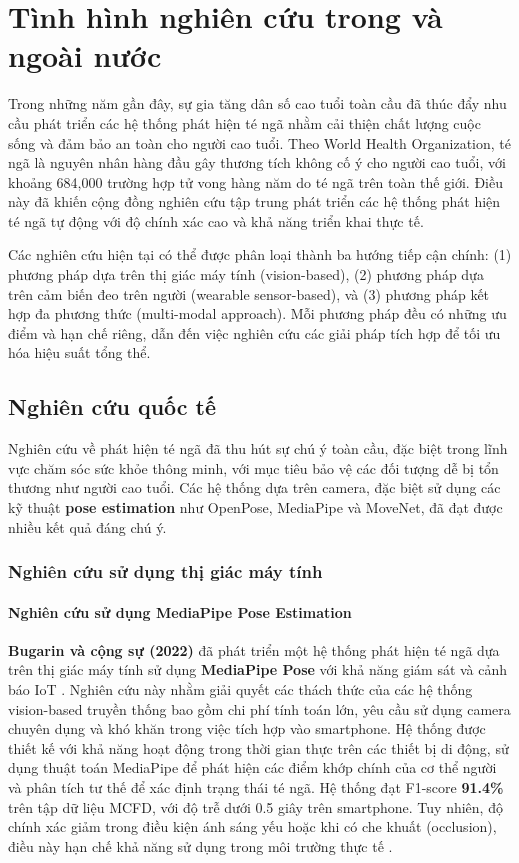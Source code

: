 \section{Tình hình nghiên cứu trong và ngoài nước}

Trong những năm gần đây, sự gia tăng dân số cao tuổi toàn cầu đã thúc đẩy nhu cầu phát triển các hệ thống phát hiện té ngã nhằm cải thiện chất lượng cuộc sống và đảm bảo an toàn cho người cao tuổi. Theo World Health Organization, té ngã là nguyên nhân hàng đầu gây thương tích không cố ý cho người cao tuổi, với khoảng 684,000 trường hợp tử vong hàng năm do té ngã trên toàn thế giới. Điều này đã khiến cộng đồng nghiên cứu tập trung phát triển các hệ thống phát hiện té ngã tự động với độ chính xác cao và khả năng triển khai thực tế.

Các nghiên cứu hiện tại có thể được phân loại thành ba hướng tiếp cận chính: (1) phương pháp dựa trên thị giác máy tính (vision-based), (2) phương pháp dựa trên cảm biến đeo trên người (wearable sensor-based), và (3) phương pháp kết hợp đa phương thức (multi-modal approach). Mỗi phương pháp đều có những ưu điểm và hạn chế riêng, dẫn đến việc nghiên cứu các giải pháp tích hợp để tối ưu hóa hiệu suất tổng thể.

\subsection{Nghiên cứu quốc tế}

Nghiên cứu về phát hiện té ngã đã thu hút sự chú ý toàn cầu, đặc biệt trong lĩnh vực chăm sóc sức khỏe thông minh, với mục tiêu bảo vệ các đối tượng dễ bị tổn thương như người cao tuổi. Các hệ thống dựa trên camera, đặc biệt sử dụng các kỹ thuật \textbf{pose estimation} như OpenPose, MediaPipe và MoveNet, đã đạt được nhiều kết quả đáng chú ý.

\subsubsection{Nghiên cứu sử dụng thị giác máy tính}

\paragraph{Nghiên cứu sử dụng MediaPipe Pose Estimation}
\textbf{Bugarin và cộng sự (2022)} đã phát triển một hệ thống phát hiện té ngã dựa trên thị giác máy tính sử dụng \textbf{MediaPipe Pose} với khả năng giám sát và cảnh báo IoT \cite{bugarin2022}. Nghiên cứu này nhằm giải quyết các thách thức của các hệ thống vision-based truyền thống bao gồm chi phí tính toán lớn, yêu cầu sử dụng camera chuyên dụng và khó khăn trong việc tích hợp vào smartphone. Hệ thống được thiết kế với khả năng hoạt động trong thời gian thực trên các thiết bị di động, sử dụng thuật toán MediaPipe để phát hiện các điểm khớp chính của cơ thể người và phân tích tư thế để xác định trạng thái té ngã. Hệ thống đạt F1-score \textbf{91.4\%} trên tập dữ liệu MCFD, với độ trễ dưới 0.5 giây trên smartphone. Tuy nhiên, độ chính xác giảm trong điều kiện ánh sáng yếu hoặc khi có che khuất (occlusion), điều này hạn chế khả năng sử dụng trong môi trường thực tế \cite{bugarin2022}.

